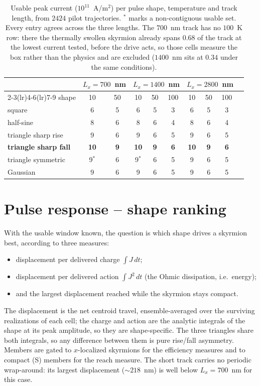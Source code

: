 \documentclass[11pt]{article}
\begin{document}
\begin{table}[H]
\centering
\caption{Usable peak current ($10^{11}$~A/m$^2$) per pulse shape,
temperature and track length, from $2424$ pilot trajectories.
$^{*}$ marks a non-contiguous usable set. Every entry agrees across the
three lengths. The $700$~nm track has no $100$~K row: there the
thermally swollen skyrmion already spans $0.68$ of the track at the
lowest current tested, before the drive acts, so those cells measure
the box rather than the physics and are excluded ($1400$~nm sits at
$0.34$ under the same conditions).}
\label{tab:pulsecaps}
\begin{tabular}{lccccccccc}
\toprule
& \multicolumn{2}{c}{$L_x=700$~nm}
& \multicolumn{3}{c}{$L_x=1400$~nm}
& \multicolumn{3}{c}{$L_x=2800$~nm}\\
\cmidrule(lr){2-3}\cmidrule(lr){4-6}\cmidrule(lr){7-9}
shape & 10 & 50 & 10 & 50 & 100 & 10 & 50 & 100\\
\midrule
square              & 6 & 5 & 6 & 5 & 3 & 6 & 5 & 3\\
half-sine           & 8 & 6 & 8 & 6 & 4 & 8 & 6 & 4\\
triangle sharp rise & 9 & 6 & 9 & 6 & 5 & 9 & 6 & 5\\
\textbf{triangle sharp fall}
                    & \textbf{10} & \textbf{9} & \textbf{10}
                    & \textbf{9} & \textbf{6} & \textbf{10}
                    & \textbf{9} & \textbf{6}\\
triangle symmetric  & 9$^{*}$ & 6 & 9$^{*}$ & 6 & 5 & 9 & 6 & 5\\
Gaussian            & 9 & 6 & 9 & 6 & 5 & 9 & 6 & 5\\
\bottomrule
\end{tabular}
\end{table}

\section{Pulse response -- shape ranking}
\label{sec:shaperank}

With the usable window known, the question is which shape drives a
skyrmion best, according to three measures:
\begin{itemize}
\item displacement per delivered charge $\int J\,dt$; \\
\item displacement per delivered action $\int J^2\,dt$
(the Ohmic dissipation, i.e.\ energy); \\
\item and the largest displacement reached while the skyrmion stays compact.
\end{itemize}
The displacement is the net centroid travel, ensemble-averaged over the
surviving realizations of each cell; the charge and action are the
analytic integrals of the shape at its peak amplitude, so they are 
shape-specific. The three triangles share both integrals, so
any difference between them is pure rise/fall asymmetry. Members are
gated to $x$-localized skyrmions for the efficiency measures and to
compact (S) members for the reach measure. 
The short track carries no periodic wrap-around:
its largest displacement ($\sim\!218$~nm) is well below
$L_x=700$~nm for this case.
\end{document}

